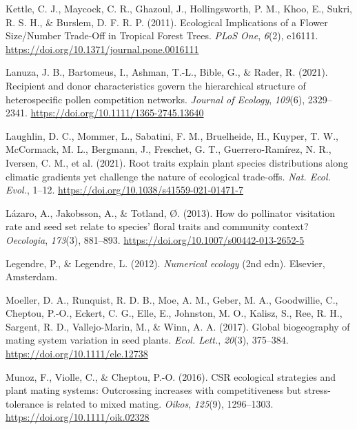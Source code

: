 \documentclass[
  12pt,
  a4paper,
]{article}
\newlength{\cslhangindent}
\newlength{\cslentryspacingunit} %
\newenvironment{CSLReferences}[2] %
 {%
  \setlength{\parindent}{0pt}
  \ifodd #1
  \let\oldpar\par
  \def\par{\hangindent=\cslhangindent\oldpar}
  \fi
  \setlength{\parskip}{#2\cslentryspacingunit}
 }%
 {}
\begin{document}
\begin{CSLReferences}{1}{0}
\leavevmode{}%
Kettle, C. J., Maycock, C. R., Ghazoul, J., Hollingsworth, P. M., Khoo, E., Sukri, R. S. H., \& Burslem, D. F. R. P. (2011). Ecological {Implications} of a {Flower Size}/{Number Trade}-{Off} in {Tropical Forest Trees}. \emph{PLoS One}, \emph{6}(2), e16111. \url{https://doi.org/10.1371/journal.pone.0016111}

\leavevmode{}%
Lanuza, J. B., Bartomeus, I., Ashman, T.-L., Bible, G., \& Rader, R. (2021). Recipient and donor characteristics govern the hierarchical structure of heterospecific pollen competition networks. \emph{Journal of Ecology}, \emph{109}(6), 2329--2341. \url{https://doi.org/10.1111/1365-2745.13640}

\leavevmode{}%
Laughlin, D. C., Mommer, L., Sabatini, F. M., Bruelheide, H., Kuyper, T. W., McCormack, M. L., Bergmann, J., Freschet, G. T., Guerrero-Ramírez, N. R., Iversen, C. M., et al. (2021). Root traits explain plant species distributions along climatic gradients yet challenge the nature of ecological trade-offs. \emph{Nat. Ecol. Evol.}, 1--12. \url{https://doi.org/10.1038/s41559-021-01471-7}

\leavevmode{}%
Lázaro, A., Jakobsson, A., \& Totland, Ø. (2013). How do pollinator visitation rate and seed set relate to species' floral traits and community context? \emph{Oecologia}, \emph{173}(3), 881--893. \url{https://doi.org/10.1007/s00442-013-2652-5}

\leavevmode{}%
Legendre, P., \& Legendre, L. (2012). \emph{Numerical ecology} ({2nd edn}). {Elsevier, Amsterdam}.

\leavevmode{}%
Moeller, D. A., Runquist, R. D. B., Moe, A. M., Geber, M. A., Goodwillie, C., Cheptou, P.-O., Eckert, C. G., Elle, E., Johnston, M. O., Kalisz, S., Ree, R. H., Sargent, R. D., Vallejo-Marin, M., \& Winn, A. A. (2017). Global biogeography of mating system variation in seed plants. \emph{Ecol. Lett.}, \emph{20}(3), 375--384. \url{https://doi.org/10.1111/ele.12738}

\leavevmode{}%
Munoz, F., Violle, C., \& Cheptou, P.-O. (2016). {CSR} ecological strategies and plant mating systems: Outcrossing increases with competitiveness but stress-tolerance is related to mixed mating. \emph{Oikos}, \emph{125}(9), 1296--1303. \url{https://doi.org/10.1111/oik.02328}


\end{CSLReferences}
\end{document}
